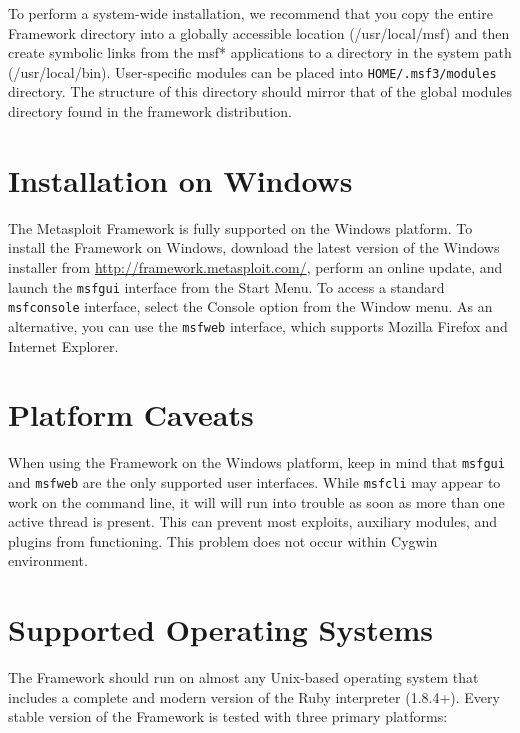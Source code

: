 \documentclass{report}
\begin{document}
\par
To perform a system-wide installation, we recommend that you copy the entire
Framework directory into a globally accessible location (/usr/local/msf) and
then create symbolic links from the msf* applications to a directory in the
system path (/usr/local/bin). User-specific modules can be placed into
\texttt{HOME/.msf3/modules} directory.  The structure of this directory should
mirror that of the global modules directory found in the framework
distribution.

    \section{Installation on Windows}
    \label{INSTALL-WIN32}

\par
The Metasploit Framework is fully supported on the Windows platform. To install the Framework on Windows, 
download the latest version of the Windows installer from \url{http://framework.metasploit.com/}, perform 
an online update, and launch the \texttt{msfgui} interface from the Start Menu. To access a standard
\texttt{msfconsole} interface, select the Console option from the Window menu. As an alternative, you can
use the \texttt{msfweb} interface, which supports Mozilla Firefox and Internet Explorer.


    \section{Platform Caveats}
    \label{INSTALL-CAVEAT}

\par
When using the Framework on the Windows platform, keep in mind that \texttt{msfgui} and \texttt{msfweb} are the only
supported user interfaces. While \texttt{msfcli} may appear to work on the command line, it will will run into
trouble as soon as more than one active thread is present. This can prevent most exploits, auxiliary modules,
and plugins from functioning. This problem does not occur within Cygwin environment.

    \section{Supported Operating Systems}
    \label{INSTALL-SUPPORT}

\par
The Framework should run on almost any Unix-based operating system that includes
a complete and modern version of the Ruby interpreter (1.8.4+). Every stable
version of the Framework is tested with three primary platforms: 
\end{document}
